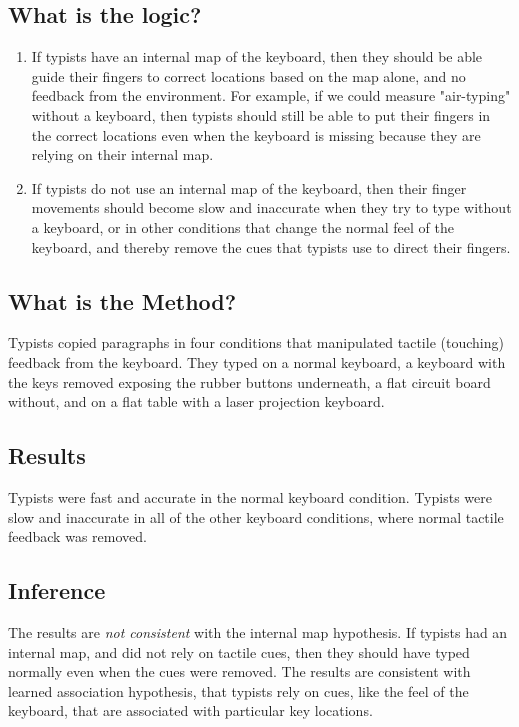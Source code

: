 \subsection{What is the logic?}
\begin{enumerate}
\item If typists have an internal map of the keyboard, then they should be able guide their fingers to correct locations based on the map alone, and no feedback from the environment. For example, if we could measure "air-typing" without a keyboard, then typists should still be able to put their fingers in the correct locations even when the keyboard is missing because they are relying on their internal map.

\item If typists do not use an internal map of the keyboard, then their finger movements should become slow and inaccurate when they try to type without a keyboard, or in other conditions that change the normal feel of the keyboard, and thereby remove the cues that typists use to direct their fingers.
\end{enumerate}

\subsection{What is the Method?}
Typists copied paragraphs in four conditions that manipulated tactile (touching) feedback from the keyboard. They typed on a normal keyboard, a keyboard with the keys removed exposing the rubber buttons underneath, a flat circuit board without, and on a flat table with a laser projection keyboard.

\subsection{Results}

Typists were fast and accurate in the normal keyboard condition. Typists were slow and inaccurate in all of the other keyboard conditions, where normal tactile feedback was removed.

\subsection{Inference}

The results are \emph{not consistent} with the internal map hypothesis. If typists had an internal map, and did not rely on tactile cues, then they should have typed normally even when the cues were removed. The results are consistent with learned association hypothesis, that typists rely on cues, like the feel of the keyboard, that are associated with particular key locations.

